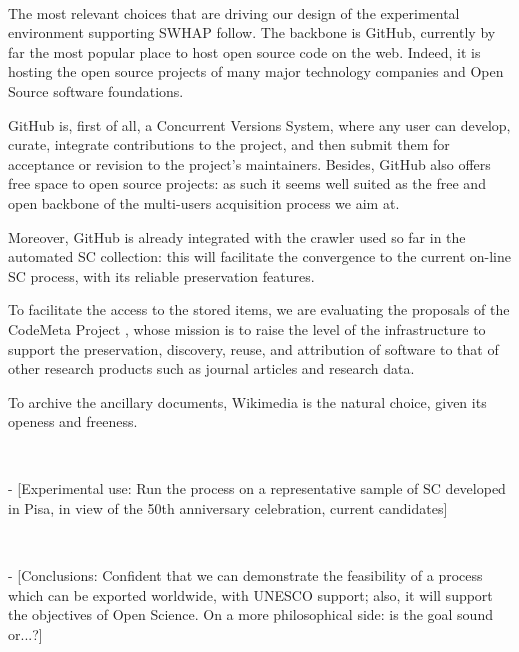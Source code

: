 \documentclass[a4paper]{article}
\begin{document}
\

\noindent
The most relevant choices that are driving our design of the experimental  environment supporting SWHAP follow. The backbone is GitHub, currently by far the most popular place to host open source code on the web. Indeed, it is hosting the open source projects of many major technology companies and Open Source software foundations.

GitHub is, first of all, a Concurrent Versions System, where any user can develop, curate, integrate contributions to the project, and then submit them  for acceptance or revision to the project's maintainers. Besides, GitHub also offers free space to open source projects: as such it seems well suited as the free and open backbone of the multi-users acquisition process we aim at.

Moreover, GitHub is already integrated with the crawler used so far in the automated SC collection: this will facilitate the convergence to the current on-line SC process, with its reliable preservation features. 

To facilitate the access to the stored items, we are evaluating the proposals of the CodeMeta Project \cite{CodeMeta}, whose mission is to raise the level of the infrastructure to support the preservation, discovery, reuse, and attribution of software to that of other research products such as journal articles and research data.
\

\noindent
To archive the ancillary documents, Wikimedia \cite{wiki:Wikimedia_movement} is the natural choice, given its openess and freeness.  

\

 - [Experimental use: Run the process on a representative sample of SC developed in Pisa, in view of the 50th anniversary celebration, current candidates] 

\

 - [Conclusions: Confident that we can demonstrate the feasibility of a process which can be exported worldwide, with UNESCO support; also, it will support the objectives of Open Science. On a more philosophical side: is the goal sound or...?] 

\


\nocite{*}
\printbibliography



	
	
\end{document}
